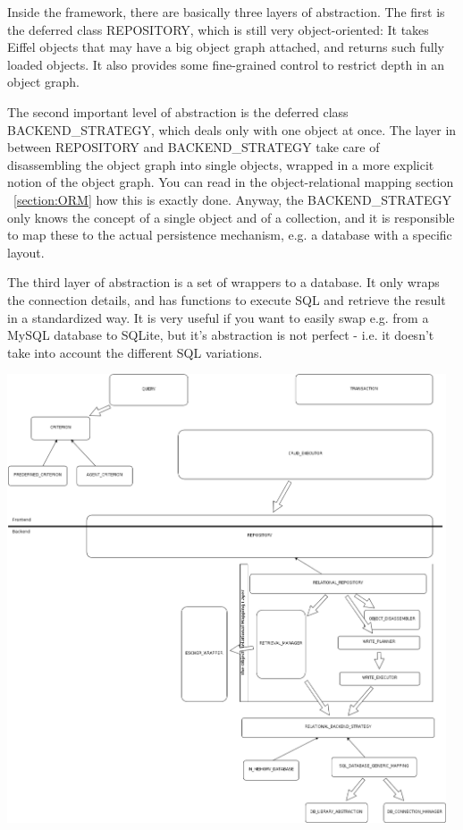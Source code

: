 Inside the framework, there are basically three layers of abstraction. The first is the deferred class REPOSITORY, which is still very object-oriented:
It takes Eiffel objects that may have a big object graph attached, and returns such fully loaded objects. 
It also provides some fine-grained control to restrict depth in an object graph.

The second important level of abstraction is the deferred class BACKEND_STRATEGY, which deals only with one object at once. 
The layer in between REPOSITORY and BACKEND_STRATEGY take care of disassembling the object graph into single objects, wrapped in a more explicit notion of the object graph. 
You can read in the object-relational mapping section ~\ref{section:ORM} how this is exactly done.
Anyway, the BACKEND_STRATEGY only knows the concept of a single object and of a collection, and it is responsible to map these to the actual persistence mechanism, e.g. a database with a specific layout. 

The third layer of abstraction is a set of wrappers to a database. It only wraps the connection details, and has functions to execute SQL and retrieve the result in a standardized way.
It is very useful if you want to easily swap e.g. from a MySQL database to SQLite, but it's abstraction is not perfect - i.e. it doesn't take into account the different SQL variations.



\includegraphics[width = 13cm] {class_diagram.png}

